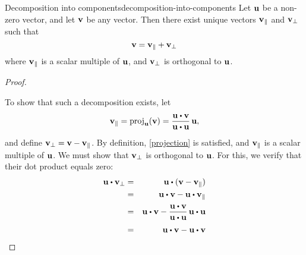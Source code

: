 \begin{theorem}{Decomposition into components}{decomposition-into-components}
  Let $\vect{u}$ be a non-zero vector, and let $\vect{v}$ be any
  vector. Then there exist unique vectors $\vect{v}_{\coll}$ and
  $\vect{v}_{\bot}$ such that
  \begin{equation}\label{projection}
    \vect{v}=\vect{v}_{\coll}+\vect{v}_{\bot }
  \end{equation}
  where $\vect{v}_{\coll}$ is a scalar multiple of $\vect{u}$,
  and $\vect{v}_{\bot}$ is orthogonal to $\vect{u}$.
\end{theorem}

\begin{proof}
  \begin{center}
  \end{center}
  To show that such a decomposition exists, let
  \begin{equation*}
    \vect{v}_{\coll} = \proj_{\vect{u}}(\vect{v}) = \frac{\vect{u}\dotprod \vect{v}}{\vect{u}\dotprod \vect{u}}\, \vect{u},
  \end{equation*}
  and define $\vect{v}_{\bot} = \vect{v}-\vect{v}_{\coll}$. By
  definition, {\eqref{projection}} is satisfied, and
  $\vect{v}_{\coll}$ is a scalar multiple of $\vect{u}$. We must show
  that $\vect{v}_{\bot}$ is orthogonal to $\vect{u}$. For this,
  we verify that their dot product equals zero:
  \begin{eqnarray*}
    \vect{u}\dotprod\vect{v}_{\bot}
    &=& \vect{u}\dotprod(\vect{v}-\vect{v}_{\coll}) \\
    &=& \vect{u}\dotprod\vect{v}-\vect{u}\dotprod\vect{v}_{\coll} \\
    &=& \vect{u}\dotprod \vect{v}-\frac{\vect{u}\dotprod \vect{v}}{\vect{u}\dotprod\vect{u}}\,\vect{u}\dotprod \vect{u} \\
    &=& \vect{u}\dotprod\vect{v}-\vect{u}\dotprod \vect{v} \\

\end{eqnarray*}
\end{proof}
